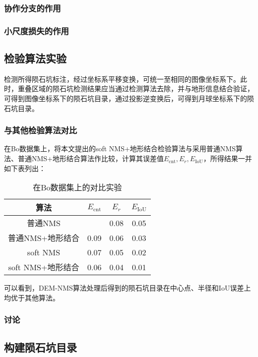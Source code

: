 \subsubsection{协作分支的作用}

\subsubsection{小尺度损失的作用}

\subsection{检验算法实验}
检测所得陨石坑标注，经过坐标系平移变换，可统一至相同的图像坐标系下。此时，重叠区域的陨石坑检测结果应当通过检测算法去除，并与地形信息结合验证，可得到图像坐标系下的陨石坑目录，通过投影逆变换后，可得到月球坐标系下的陨石坑目录。
\subsubsection{与其他检验算法对比}
在Bo\cite{boCatalogueMeterscaleImpact2022}数据集上，将本文提出的soft NMS+地形结合检验算法与采用普通NMS算法、普通NMS+地形结合算法作比较，计算其误差值$E_\mathrm{cnt},E_r,E_\mathrm{IoU}$，所得结果一并如下表列出：
\begin{table}[H]
  \begin{center}
  \caption{在Bo\cite{boCatalogueMeterscaleImpact2022}数据集上的对比实验}
  \label{tab:verify-comp}
  \begin{tabular}{ c  c  c  c }
  \toprule
  算法 & $E_\mathrm{cnt}$ & $E_r$ & $E_\mathrm{IoU}$ \\
  \hline
  普通NMS &  & 0.08 & 0.05 \\
  普通NMS+地形结合 & 0.09 & 0.06 & 0.03 \\
  soft NMS & 0.07 & 0.05 & 0.02 \\
  soft NMS+地形结合 & 0.06 & 0.04 & 0.01 \\
  \bottomrule 
  \end{tabular}
  \end{center}
\end{table}\par
可以看到，DEM-NMS算法处理后得到的陨石坑目录在中心点、半径和IoU误差上均优于其他算法。
\subsubsection{讨论}
\subsection{构建陨石坑目录}
